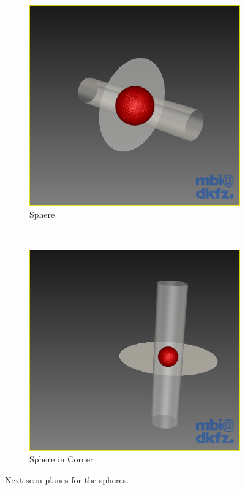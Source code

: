 \begin{figure}[H]
  \centering
  \begin{subfigure}[b]{0.4\textwidth}
    \includegraphics[width=\textwidth]{images/next_scan_plane/sphere.png}
    \caption{Sphere}
    \label{fig:nextscanplanesphere}
  \end{subfigure}%
  ~ %
  \begin{subfigure}[b]{0.4\textwidth}
    \includegraphics[width=\textwidth]{images/next_scan_plane/sphere_in_corner.png}
    \caption{Sphere in Corner}
    \label{fig:nextscanplanespherecorner}
  \end{subfigure}
  \caption{Next scan planes for the spheres.}\label{fig:nextscanplanespheres}
\end{figure}


